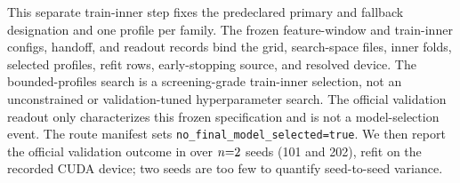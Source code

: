This separate train-inner step fixes the predeclared primary and fallback
designation and one profile per family. The frozen feature-window and
train-inner configs, handoff, and readout records bind the grid, search-space
files, inner folds, selected profiles, refit rows, early-stopping source, and
resolved device. The bounded-profiles search is a screening-grade train-inner
selection, not an unconstrained or validation-tuned hyperparameter search. The
official validation readout only characterizes this frozen specification and is
not a model-selection event. The route manifest sets
\nolinkurl{no_final_model_selected=true}. We then report the official validation
outcome in \macrofone{} over $n{=}2{}$ seeds (101 and 202), refit on the
recorded CUDA device; two seeds are too few to quantify seed-to-seed variance.
